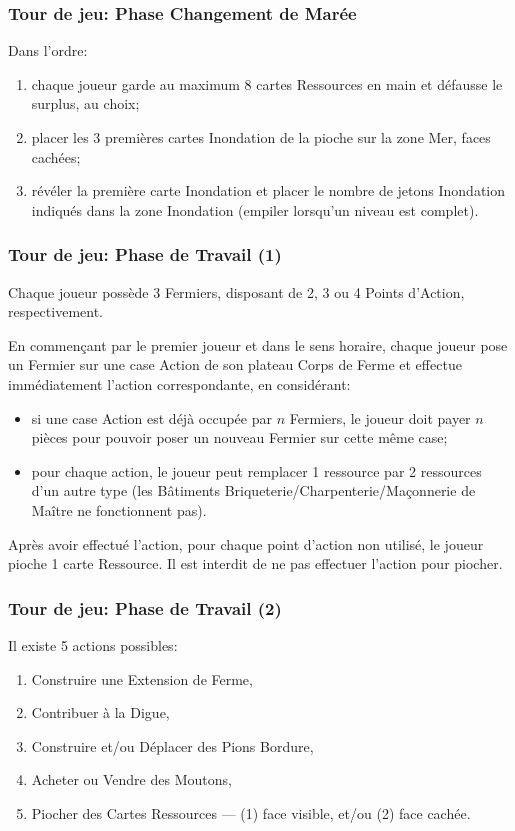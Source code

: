\documentclass[11pt]{beamer}
\begin{document}
	\begin{frame}
		\frametitle{Tour de jeu: Phase Changement de Marée}
		
		Dans l'ordre:
		\begin{enumerate}
			\item chaque joueur garde au maximum 8 cartes Ressources en main et défausse le surplus, au choix;
			\item placer les 3 premières cartes Inondation de la pioche sur la zone Mer, faces cachées;
			\item révéler la première carte Inondation et placer le nombre de jetons Inondation indiqués dans la zone Inondation (empiler lorsqu'un niveau est complet).
		\end{enumerate}
	\end{frame}

	\begin{frame}
		\frametitle{Tour de jeu: Phase de Travail (1)}
		
		Chaque joueur possède 3 Fermiers, disposant de 2, 3 ou 4 Points d'Action, respectivement.
		
		En commençant par le premier joueur et dans le sens horaire, chaque joueur pose un Fermier sur une case Action de son plateau Corps de Ferme et effectue immédiatement l'action correspondante, en considérant:
		\begin{itemize}
			\item si une case Action est déjà occupée par $n$ Fermiers, le joueur doit payer $n$ pièces pour pouvoir poser un nouveau Fermier sur cette même case;
			\item pour chaque action, le joueur peut remplacer 1 ressource par 2 ressources d'un autre type (les Bâtiments Briqueterie/Charpenterie/Maçonnerie de Maître ne fonctionnent pas).
		\end{itemize}
		
		Après avoir effectué l'action, pour chaque point d'action non utilisé, le joueur pioche 1 carte Ressource.
		Il est interdit de ne pas effectuer l'action pour piocher.
	\end{frame}
	\begin{frame}
		\frametitle{Tour de jeu: Phase de Travail (2)}
		
		Il existe \alert{5 actions possibles}:
		\begin{enumerate}
			\item Construire une Extension de Ferme,
			\item Contribuer à la Digue,
			\item Construire et/ou Déplacer des Pions Bordure,
			\item Acheter ou Vendre des Moutons,
			\item Piocher des Cartes Ressources --- (1) face visible, et/ou (2) face cachée.
		\end{enumerate}
		
	\end{frame}
\end{document}
